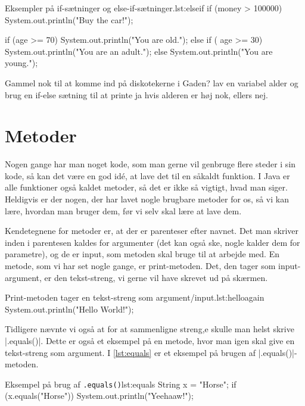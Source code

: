 {\begin{JavaCode}{Eksempler på if-sætninger og else-if-sætninger.}{lst:elseif}
	if (money > 100000) {
		System.out.println("Buy the car!");
	}
	
	if (age >= 70) {
		System.out.println("You are old.");
	} else if ( age >= 30) {
		System.out.println("You are an adult.");
	} else {
		System.out.println("You are young.");
	}
\end{JavaCode}

\begin{exercise}
	Gammel nok til at komme ind på diskotekerne i Gaden? lav en variabel alder og brug en if-else sætning til at printe ja hvis alderen er høj nok, ellers nej.
\end{exercise}

\section{Metoder}
Nogen gange har man noget kode, som man gerne vil genbruge flere steder i sin kode, så kan det være en god idé, at lave det til en såkaldt funktion. I Java er alle funktioner også kaldet metoder, så det er ikke så vigtigt, hvad man siger. Heldigvis er der nogen, der har lavet nogle brugbare metoder for os, så vi kan lære, hvordan man bruger dem, før vi selv skal lære at lave dem. 

Kendetegnene for metoder er, at der er parenteser efter navnet. Det man skriver inden i parentesen kaldes for argumenter (det kan også ske, nogle kalder dem for parametre), og de er input, som metoden skal bruge til at arbejde med. En metode, som vi har set nogle gange, er print-metoden. Det, den tager som input-argument, er den tekst-streng, vi gerne vil have skrevet ud på skærmen.

\begin{JavaCode}{Print-metoden tager en tekst-streng som argument/input.}{lst:helloagain}
	System.out.println("Hello World!");
\end{JavaCode}

Tidligere nævnte vi også at for at sammenligne streng,e skulle man helst skrive \JavaInline|.equals()|. Dette er også et eksempel på en metode, hvor man igen skal give en tekst-streng som argument. I \autoref{lst:equals} er et eksempel på brugen af \JavaInline|.equals()|-metoden.

\begin{JavaCode}{Eksempel på brug af \texttt{.equals()}}{lst:equals}
	String x = "Horse";
	if (x.equals("Horse")) {
		System.out.println("Yeehaaw!");
	}
\end{JavaCode}

}

